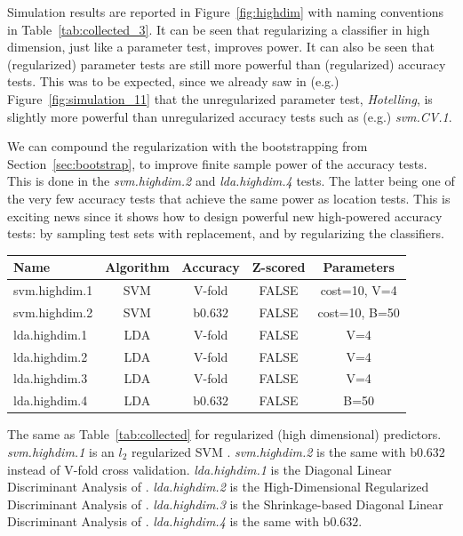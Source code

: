 \documentclass[12pt,a4paper]{article}
\begin{document}
Simulation results are reported in Figure~\ref{fig:highdim} with naming conventions in Table~\ref{tab:collected_3}.
It can be seen that regularizing a classifier in high dimension, just like a parameter test, improves power. 
It can also be seen that (regularized) parameter tests are still more powerful than (regularized) accuracy tests. 
This was to be expected, since we already saw in (e.g.) Figure~\ref{fig:simulation_11} that the unregularized parameter test, \emph{Hotelling}, is slightly more powerful than unregularized accuracy tests such as (e.g.) \emph{svm.CV.1}.

We can compound the regularization with the bootstrapping from Section~\ref{sec:bootstrap}, to improve finite sample power of the accuracy tests. 
This is done in the \emph{svm.highdim.2} and \emph{lda.highdim.4} tests. 
The latter being one of the very few accuracy tests that achieve the same power as location tests. 
This is exciting news since it shows how to design powerful new high-powered accuracy tests: by sampling test sets with replacement, and by regularizing the classifiers. 


\bigskip

\begin{tcolorbox}
\centering
\begin{tabular}{l|c|c|c|c}
Name & Algorithm & Accuracy & Z-scored & Parameters\\ 
\hline
\hline
svm.highdim.1 & SVM & V-fold & FALSE & cost=10, V=4 \\ 
svm.highdim.2 & SVM & b$0.632$ & FALSE & cost=10, B=50 \\ 
lda.highdim.1 & LDA & V-fold & FALSE & V=4 \\ 
lda.highdim.2 & LDA & V-fold & FALSE & V=4 \\ 
lda.highdim.3 & LDA & V-fold & FALSE & V=4 \\ 
lda.highdim.4 & LDA & b$0.632$ & FALSE & B=50 \\ 
\end{tabular} 
\captionsetup{type=table}
\caption{
The same as Table~\ref{tab:collected} for regularized (high dimensional) predictors. 
\emph{svm.highdim.1} is an $l_2$ regularized SVM \citep{friedman_regularization_2010}. 
\emph{svm.highdim.2} is the same with b$0.632$ instead of V-fold cross validation. 
\emph{lda.highdim.1} is the Diagonal Linear Discriminant Analysis of \cite{dudoit_comparison_2002}.
\emph{lda.highdim.2} is the High-Dimensional Regularized Discriminant Analysis of \cite{ramey_high-dimensional_2016}.
\emph{lda.highdim.3} is the Shrinkage-based Diagonal Linear Discriminant Analysis of \cite{pang_shrinkage-based_2009}.
\emph{lda.highdim.4} is the same with b$0.632$.
} 
\label{tab:collected_3}
\end{tcolorbox}
\end{document}
